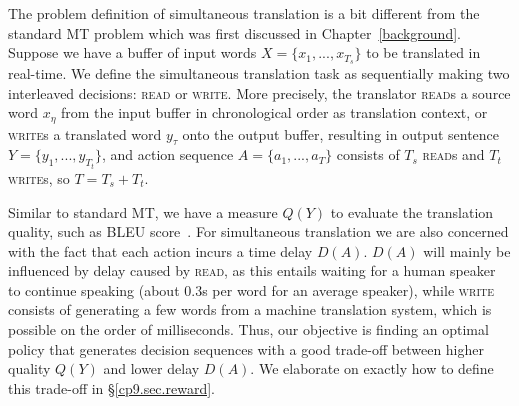 The problem definition of simultaneous translation is a bit different from the standard MT problem which was first discussed in Chapter~\ref{background}.
Suppose we have a buffer of input words $X = \{x_1, ..., x_{T_s}\}$ to be translated in real-time. We define the simultaneous translation task as sequentially making two interleaved decisions: \textsc{read} or \textsc{write}.
More precisely, the translator \textsc{read}s a source word $x_\eta$ from the input buffer in chronological order as translation context, or \textsc{write}s a translated word $y_\tau$ onto the output buffer, resulting in output sentence $Y = \{y_1, ..., y_{T_t}\}$,
and action sequence $A=\{a_1, ..., a_T\}$ consists of $T_s$ \textsc{read}s and $T_t$ \textsc{write}s, so $T=T_s+T_t$.

Similar to standard MT, we have a measure $Q(Y)$ to evaluate the translation quality, such as BLEU score~\cite{papineni2002bleu}.
For simultaneous translation we are also concerned with the fact that each action incurs a time delay $D(A)$.
$D(A)$ will mainly be influenced by delay caused by \textsc{read}, as this entails waiting for a human speaker to continue speaking (about $0.3$s per word for an average speaker), while \textsc{write} consists of generating a few words from a machine translation system, which is possible on the order of milliseconds.
Thus, our objective is finding an optimal policy that generates decision sequences with a good trade-off between higher quality $Q(Y)$ and lower delay $D(A)$.
We elaborate on exactly how to define this trade-off in \S\ref{cp9.sec.reward}.


